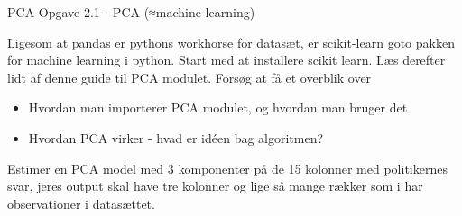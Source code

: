 \documentclass[10pt]{beamer}
\begin{document}
\begin{frame}[fragile]{PCA}
Opgave 2.1 - PCA (≈machine learning)

Ligesom at pandas er pythons workhorse for datasæt, er scikit-learn goto pakken for machine learning i python. Start med at installere scikit learn. Læs derefter lidt af denne guide til PCA modulet. Forsøg at få et overblik over

  \begin{itemize}
    \item Hvordan man importerer PCA modulet, og hvordan man bruger det
    \item  Hvordan PCA virker - hvad er idéen bag algoritmen?
  \end{itemize}

Estimer en PCA model med 3 komponenter på de 15 kolonner med politikernes svar, jeres output skal have tre kolonner og lige så mange rækker som i har observationer i datasættet.
\end{frame}
\end{document}
